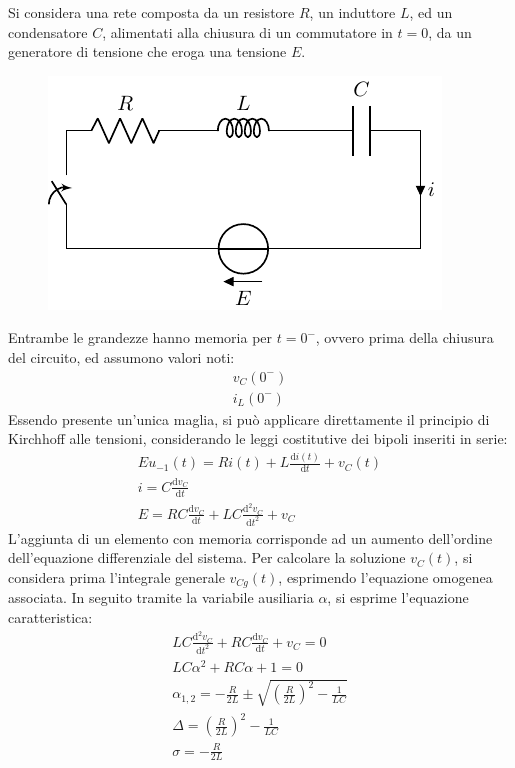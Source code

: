 \documentclass{article}
\newcommand{\df}{\mathrm{d}}
\numberwithin{equation}{subsection}
\begin{document}
Si considera una rete composta da un resistore $R$, un induttore $L$, ed un condensatore $C$, alimentati alla chiusura di un commutatore in $t=0$, da un generatore 
di tensione che eroga una tensione $E$.
\begin{figure}[H]%
    \centering
    \includegraphics{circuito-rlc-serie.pdf}%
    \label{fig:circuito-rlc-serie}
\end{figure}
Entrambe le grandezze hanno memoria per $t=0^-$, ovvero prima della chiusura del circuito, ed assumono valori noti: 
\begin{gather*}
    v_C(0^-)\\
    i_L(0^-)
\end{gather*}
Essendo presente un'unica maglia, si può applicare direttamente il principio di Kirchhoff alle tensioni, considerando le leggi costitutive dei bipoli inseriti in serie:
\begin{gather*}
    Eu_{-1}(t)=Ri(t)+\displaystyle L\frac{\df i(t)}{\df t}+v_C(t)\\
    i=\displaystyle C\frac{\df v_C}{\df t}\\
    E=RC\displaystyle\frac{\df v_C}{\df t}+LC\frac{\df^2v_C}{\df t^2}+v_C
\end{gather*}
L'aggiunta di un elemento con memoria corrisponde ad un aumento dell'ordine dell'equazione differenziale del sistema. 
Per calcolare la soluzione $v_C(t)$, si considera prima l'integrale generale $v_{Cg}(t)$, esprimendo l'equazione omogenea associata. In seguito tramite la variabile ausiliaria 
$\alpha$, si esprime l'equazione caratteristica:
\begin{gather*}
    LC\frac{\df^2v_C}{\df t^2}+RC\displaystyle\frac{\df v_C}{\df t}+v_C=0\\
    LC\alpha^2+RC\alpha+1=0\\
    \alpha_{1,2}=\displaystyle-\frac{R}{2L}\pm\sqrt{\left(\frac{R}{2L}\right)^2-\frac{1}{LC}}\\
    \Delta=\displaystyle\left(\frac{R}{2L}\right)^2-\frac{1}{LC}\\
    \sigma=\displaystyle-\frac{R}{2L}
\end{gather*}
\end{document}
